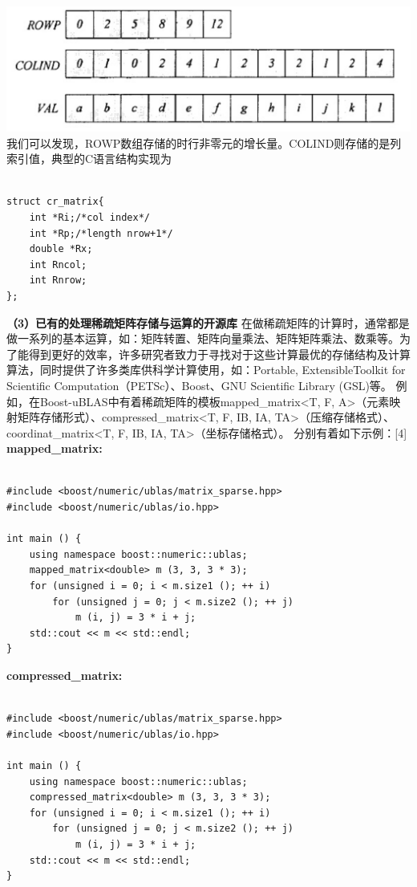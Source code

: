 \documentclass{article}
\begin{document}
\includegraphics[scale=0.25]{crs.png}
我们可以发现，ROWP数组存储的时行非零元的增长量。COLIND则存储的是列索引值，典型的C语言结构实现为\newline

\begin{lstlisting}

struct cr_matrix{ 
	int *Ri;/*col index*/ 
	int *Rp;/*length nrow+1*/ 
	double *Rx; 
	int Rncol;
	int Rnrow;
};

\end{lstlisting}

\textbf{（3）已有的处理稀疏矩阵存储与运算的开源库}
      \qquad
\newline
在做稀疏矩阵的计算时，通常都是做一系列的基本运算，如：矩阵转置、矩阵向量乘法、矩阵矩阵乘法、数乘等。为了能得到更好的效率，许多研究者致力于寻找对于这些计算最优的存储结构及计算算法，同时提供了许多类库供科学计算使用，如：Portable, ExtensibleToolkit for Scientific Computation（PETSc）、Boost、GNU Scientific Library (GSL)等。\newline
例如，在Boost-uBLAS中有着稀疏矩阵的模板mapped\_matrix<T, F, A>（元素映射矩阵存储形式）、compressed\_matrix<T, F, IB, IA, TA>（压缩存储格式）、coordinat\_matrix<T, F, IB, IA, TA>（坐标存储格式）。
分别有着如下示例：[4]\newline
\textbf{mapped\_matrix:}
\begin{lstlisting}

#include <boost/numeric/ublas/matrix_sparse.hpp>
#include <boost/numeric/ublas/io.hpp>

int main () {
    using namespace boost::numeric::ublas;
    mapped_matrix<double> m (3, 3, 3 * 3);
    for (unsigned i = 0; i < m.size1 (); ++ i)
        for (unsigned j = 0; j < m.size2 (); ++ j)
            m (i, j) = 3 * i + j;
    std::cout << m << std::endl;
}

\end{lstlisting}

\textbf{compressed\_matrix:}
\begin{lstlisting}

#include <boost/numeric/ublas/matrix_sparse.hpp>
#include <boost/numeric/ublas/io.hpp>

int main () {
    using namespace boost::numeric::ublas;
    compressed_matrix<double> m (3, 3, 3 * 3);
    for (unsigned i = 0; i < m.size1 (); ++ i)
        for (unsigned j = 0; j < m.size2 (); ++ j)
            m (i, j) = 3 * i + j;
    std::cout << m << std::endl;
}

\end{lstlisting}
\end{document}
